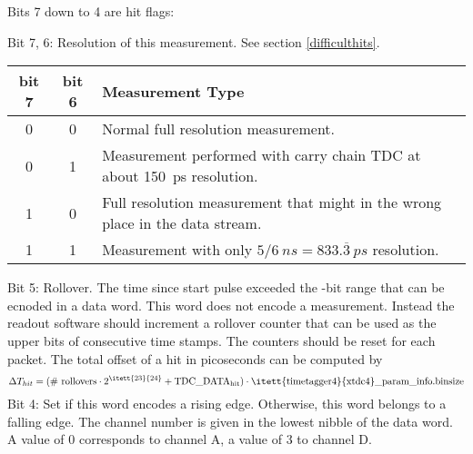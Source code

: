 	\label{flags}
	Bits 7 down to 4 are hit flags:\par
	 {
		Bit 7, 6: Resolution of this measurement. See section \ref{difficulthits}.\\
		\noindent
		\begin{small}
		\begin{tabular}{|c|c||l|}
			\hline
			bit 7 & bit 6 & Measurement Type \\\hline\hline
			0 & 0 &  Normal full resolution measurement.\\\hline
			0 & 1 &  Measurement performed with carry chain TDC at about 150~ps resolution.\\\hline
			1 & 0 &  Full resolution measurement that might in the wrong place in the data stream.\\\hline
			1 & 1 &  Measurement with only $5/6~ns = 833.\overline{3}~ps$ resolution. \\\hline
		\end{tabular}
		\end{small}
		
	}
	Bit 5: Rollover. The time since start pulse exceeded the -bit range that can be ecnoded in a data word. This word does not encode a measurement. 
	Instead the readout software should increment a rollover counter that can be used as the upper bits of consecutive time stamps.  
	The counters should be reset for each packet.
	The total offset of a hit in picoseconds can be computed by
	\[	\Delta T_{hit} = \mathrm{(\#\ rollovers \cdot 2^{\itett{23}{24}} + TDC\_ DATA_{hit}) \cdot \itett{timetagger4}{xtdc4}\_param\_info.binsize} \]
	\indent
	Bit 4: Set if this word encodes a rising edge. Otherwise, this word belongs to a falling edge.
	The channel number is given in the lowest nibble of the data word. A value of 0 corresponds to channel A, a value of 3 to channel D.\par
